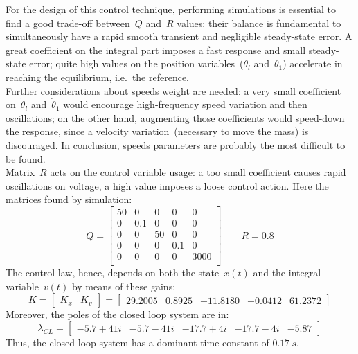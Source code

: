 For the design of this control technique, performing simulations is essential to find a good trade-off between~$Q$ and~$R$ values: their balance is fundamental to simultaneously have a rapid smooth transient and negligible steady-state error. A great coefficient on the integral part imposes a fast response and small steady-state error; quite high values on the position variables~($\theta_l$ and~$\theta_1$) accelerate in reaching the equilibrium, i.e.\ the reference. \\ Further considerations about speeds weight are needed: a very small coefficient on~$\dot \theta_l$ and~$\dot \theta_1$ would encourage high-frequency speed variation and then oscillations; on the other hand, augmenting those coefficients would speed-down the response, since a velocity variation~(necessary to move the mass) is discouraged. In conclusion, speeds parameters are probably the most difficult to be found. \\ Matrix~$R$ acts on the control variable usage: a too small coefficient causes rapid oscillations on voltage, a high value imposes a loose control action.
Here the matrices found by simulation:
\[
	Q =
	\begin{bmatrix}
		50 & 0 & 0 & 0 & 0 \\
		0 & 0.1 & 0 & 0 & 0 \\
		0 & 0 & 50 & 0 & 0 \\
		0 & 0 & 0 & 0.1 & 0 \\
		0 & 0 & 0 & 0 & 3000 \\
	\end{bmatrix}
	\qquad
	R = 0.8
\]
The control law, hence, depends on both the state~$x(t)$ and the integral variable~$v(t)$ by means of these gains:
\begin{equation}
	K =
	\left[
	\begin{array}{c|c}
		K_x & K_v
	\end{array}
	\right]
	=
	\left[
	\begin{array}{cccc|c}
		29.2005 & 0.8925 & -11.8180 & -0.0412 & 61.2372
	\end{array}
	\right]
	\label{eq:1dof_LQ_fastK}
\end{equation}
Moreover, the poles of the closed loop system are in:
\begin{equation}
	\lambda_{CL} =
	\begin{bmatrix}
		-5.7+41i & -5.7-41i & -17.7+4i & -17.7-4i & -5.87 
	\end{bmatrix}
\end{equation}
Thus, the closed loop system has a dominant time constant of $0.17\ s$. 
